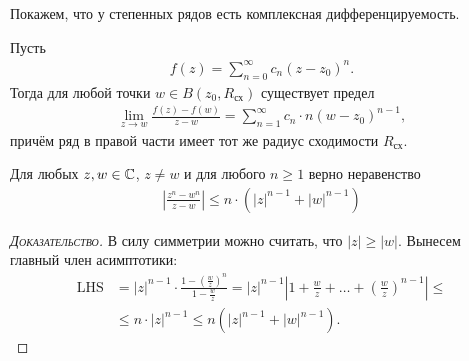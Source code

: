 \documentclass[../complex-analysis.tex]{subfiles}
\begin{document}
Покажем, что у степенных рядов есть комплексная дифференцируемость.

\begin{crly}
 \label{corollary:complex_differential_of_}
 Пусть
 \begin{align*}
  f(z) = \sum_{n=0}^{\infty} c_n(z - z_0)^{n}.
 \end{align*} Тогда для любой точки $w \in B(z_0, R_{\text{сх}})$ существует предел
 \begin{align*}
  \lim_{z \to w} \frac{f(z) - f(w)}{z - w} = \sum_{n=1}^{\infty} c_n \cdot n (w - z_0)^{n-1},
 \end{align*} причём ряд в правой части имеет тот же радиус сходимости $R_{\text{сх}}$.
\end{crly}
\begin{lm}
 \label{lemma:complex_n_w_inequality}
 Для любых $z, w \in \mathbb{C}$, $z \neq w$ и для любого $n \geqslant 1$ верно неравенство
 \begin{align*}
  \left|\frac{z^{n} - w^{n}}{z - w} \right| \leqslant n \cdot \left(\left| z \right|^{n-1} + \left| w \right|^{n-1}\right)
 \end{align*} 
\end{lm}
\begin{proof}[\normalfont\textsc{Доказательство}]
 В силу симметрии можно считать, что $\left| z \right| \geqslant \left| w \right|$. Вынесем главный член асимптотики:
 \begin{align*}
  \mathrm{LHS} &= \left| z \right|^{n-1} \cdot \frac{1 - \left( \frac{w}{z} \right)^{n}}{1 - \frac{w}{z}} = \left| z \right|^{n-1} \left| 1 + \frac{w}{z} + \ldots + \left( \frac{w}{z} \right)^{n-1} \right| \leqslant \\
  &\leqslant n \cdot \left| z \right|^{n-1} \leqslant n \left( \left| z \right|^{n-1} + \left| w \right|^{n-1} \right).
 \end{align*} 
\end{proof}
\end{document}
